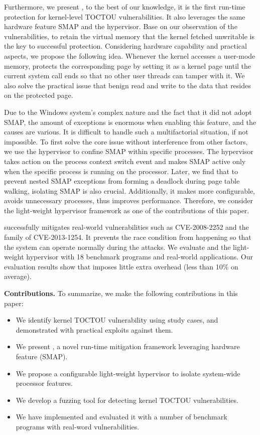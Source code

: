 Furthermore, we present \name, to the best of our knowledge, it is the first run-time protection for kernel-level TOCTOU vulnerabilities. It also leverages the same hardware feature SMAP and the hypervisor. Base on our observation of the vulnerabilities, to retain the virtual memory that the kernel fetched unwritable is the key to successful protection. Considering hardware capability and practical aspects, we propose the following idea. Whenever the kernel accesses a user-mode memory, \name protects the corresponding page by setting it as a kernel page until the current system call ends so that no other user threads can tamper with it. We also solve the practical issue that benign read and write to the data that resides on the protected page.


Due to the Windows system's complex nature and the fact that it did not adopt SMAP, the amount of exceptions is enormous when enabling this feature, and the causes are various. It is difficult to handle such a multifactorial situation, if not impossible. To first solve the core issue without interference from other factors, we use the hypervisor to confine SMAP within specific processes. The hypervisor takes action on the process context switch event and makes SMAP active only when the specific process is running on the processor. Later, we find that to prevent nested SMAP exceptions from forming a deadlock during page table walking, isolating SMAP is also crucial. Additionally, it makes \name more configurable, avoids unnecessary processes, thus improves performance. Therefore, we consider the light-weight hypervisor framework as one of the contributions of this paper.

\name successfully mitigates real-world vulnerabilities such as CVE-2008-2252 and the family of CVE-2013-1254. It prevents the race condition from happening so that the system can operate normally during the attacks. We evaluate \name and the light-weight hypervisor with 18 benchmark programs and real-world applications. Our evaluation results show that \name imposes little extra overhead (less than 10\% on average).

\textbf{Contributions.} To summarize, we make the following contributions in this paper:
\begin{itemize}[leftmargin=*]
    \item We identify kernel TOCTOU vulnerability using study cases, and demonstrated with practical exploits against them. 
    \item We present \name, a novel run-time mitigation framework leveraging hardware feature (SMAP). 
    \item We propose a configurable light-weight hypervisor to isolate system-wide processor features.
    \item We develop a fuzzing tool \toolname for detecting kernel TOCTOU vulnerabilities.
    \item We have implemented \name and evaluated it with a number of benchmark programs with real-word vulnerabilities.
  
\end{itemize}


